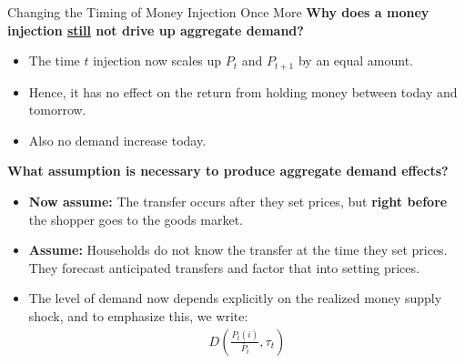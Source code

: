 \documentclass[10pt,c,aspectratio=1610,handout]{beamer}
\begin{document}
\begin{frame}{Changing the Timing of Money Injection Once More}%
  \textbf{Why does a money injection \underline{still} not drive up aggregate demand?}%
  \begin{itemize}%
    \item[$\blacktriangleright$] The time $t$ injection now scales up $P_{t}$ and $P_{t+1}$ by an equal amount.%
    \item[$\blacktriangleright$] Hence, it has no effect on the return from holding money between today and tomorrow.%
    \item[$\blacktriangleright$] Also no demand increase today.%
  \end{itemize}%
  \vspace*{0.1in}%
  \pause%
  \textbf{What assumption is necessary to produce aggregate demand effects?}%
  \begin{itemize}%
    \item[$\blacktriangleright$] \textbf{Now assume:} The transfer occurs after they set prices, but \textbf{right before} the shopper goes to the goods market.%
    \pause%
    \item[$\blacktriangleright$] \textbf{Assume:} Households do not know the transfer at the time they set prices. They forecast anticipated transfers and factor that into setting prices.%
    \pause%
    \item[$\Rightarrow$] The level of demand now depends explicitly on the realized money supply shock, and to emphasize this, we write:%
    \begin{align}%
      D \left( \frac{P_{t}(i)}{\bar{P}_{t}}, \tau_{t} \right)%
    \end{align}%
  \end{itemize}%
\end{frame}%
\end{document}
